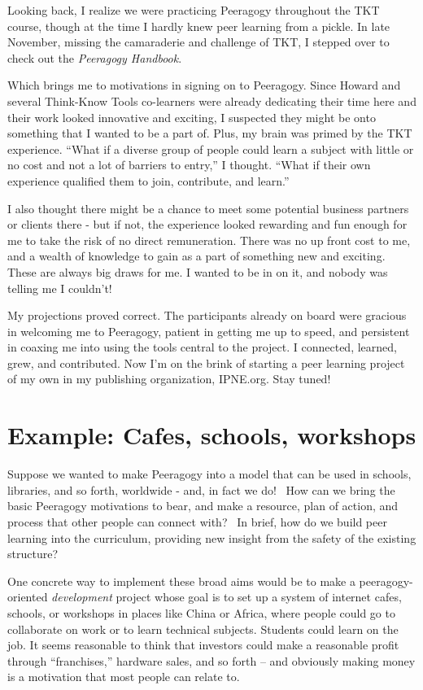 Looking back, I realize we were practicing Peeragogy throughout the TKT
course, though at the time I hardly knew peer learning from a pickle. In
late November, missing the camaraderie and challenge of TKT, I stepped
over to check out the \emph{Peeragogy Handbook}.

Which brings me to motivations in signing on to Peeragogy. Since Howard
and several Think-Know Tools co-learners were already dedicating their
time here and their work looked innovative and exciting, I suspected
they might be onto something that I wanted to be a part of. Plus, my
brain was primed by the TKT experience. ``What if a diverse group of
people could learn a subject with little or no cost and not a lot of
barriers to entry,'' I thought. ``What if their own experience qualified
them to join, contribute, and learn.''

I also thought there might be a chance to meet some potential business
partners or clients there - but if not, the experience looked rewarding
and fun enough for me to take the risk of no direct remuneration. There
was no up front cost to me, and a wealth of knowledge to gain as a part
of something new and exciting. These are always big draws for me. I
wanted to be in on it, and nobody was telling me I couldn't!

My projections proved correct. The participants already on board were
gracious in welcoming me to Peeragogy, patient in getting me up to
speed, and persistent in coaxing me into using the tools central to the
project. I connected, learned, grew, and contributed. Now I'm on the
brink of starting a peer learning project of my own in my publishing
organization, IPNE.org. Stay tuned!

\hypertarget{example-cafes-schools-workshops}{%
\section{Example: Cafes, schools,
workshops}\label{example-cafes-schools-workshops}}

Suppose we wanted to make Peeragogy into a model that can be used in
schools, libraries, and so forth, worldwide - and, in fact we do! ~How
can we bring the basic Peeragogy motivations to bear, and make a
resource, plan of action, and process that other people can connect
with? ~In brief, how do we build peer learning into the curriculum,
providing new insight from the safety of the existing structure?

One concrete way to implement these broad aims would be to make a
peeragogy-oriented \emph{development} project whose goal is to set up a
system of internet cafes, schools, or workshops in places like China or
Africa, where people could go to collaborate on work or to learn
technical subjects. Students could learn on the job. It seems reasonable
to think that investors could make a reasonable profit through
``franchises,'' hardware sales, and so forth -- and obviously making
money is a motivation that most people can relate to.

